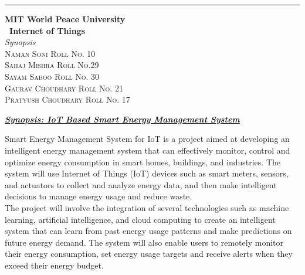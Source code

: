 \documentclass{article}
\begin{document}
\begin{titlepage} %

	\raggedleft\rule{1pt}{\textheight} %
	\hspace{0.05\textwidth} %
	\parbox[b]{0.75\textwidth}
    { %
		
		{\Huge\bfseries MIT World Peace University \\[0.5\baselineskip] \ Internet of Things}\\[2\baselineskip] %
		{\large\textit{Synopsis}}\\[4\baselineskip] %
		{\Large\textsc{Naman Soni Roll No. 10\\
        Sahaj Mishra Roll No.29\\
        Sayam Saboo Roll No. 30\\
        Gaurav Choudhary Roll No. 21\\
        Pratyush Choudhary Roll No. 17}} %
		
		\vspace{0.5\textheight} %
	}

\end{titlepage}
\begin{center}
    \large\underline{{\textbf{\textit{\bfseries Synopsis: IoT Based Smart Energy Management System}}}}\\[0.5\baselineskip]
\end{center}
Smart Energy Management System for IoT is a project aimed at developing an intelligent energy management system that can effectively monitor, control and optimize energy consumption in smart homes, buildings, and industries. The system will use Internet of Things (IoT) devices such as smart meters, sensors, and actuators to collect and analyze energy data, and then make intelligent decisions to manage energy usage and reduce waste.\\

The project will involve the integration of several technologies such as machine learning, artificial intelligence, and cloud computing to create an intelligent system that can learn from past energy usage patterns and make predictions on future energy demand. The system will also enable users to remotely monitor their energy consumption, set energy usage targets and receive alerts when they exceed their energy budget.\\
\end{document}
